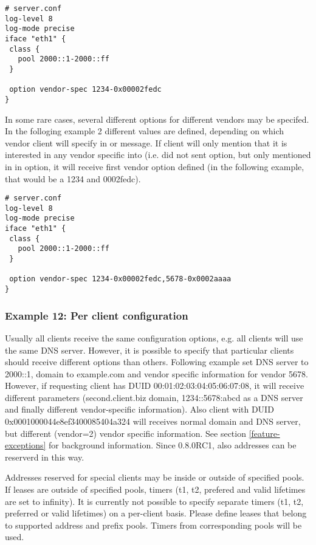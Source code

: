 \begin{lstlisting}
# server.conf
log-level 8
log-mode precise
iface "eth1" {
 class {
   pool 2000::1-2000::ff
 }

 option vendor-spec 1234-0x00002fedc
}
\end{lstlisting}

In some rare cases, several different options for different vendors
may be specifed. In the folloging example 2 different values are
defined, depending on which vendor client will specify in  or
 message. If client will only mention that it is interested in
any vendor specific into (i.e. did not sent  option, but
only mentioned in in  option, it will receive
first vendor option defined (in the following example, that would be a
1234 and 0002fedc).

\begin{lstlisting}
# server.conf
log-level 8
log-mode precise
iface "eth1" {
 class {
   pool 2000::1-2000::ff
 }

 option vendor-spec 1234-0x00002fedc,5678-0x0002aaaa
}
\end{lstlisting}

\subsubsection{Example 12: Per client configuration}
\label{example-server-exceptions}
Usually all clients receive the same configuration options, e.g. all
clients will use the same DNS server. However, it is possible to
specify that particular clients should receive different options than
others. Following example set DNS server to 2000::1, domain
to example.com and vendor specific information for vendor 5678.
However, if requesting client has DUID 00:01:02:03:04:05:06:07:08, it
will receive different parameters (second.client.biz domain,
1234::5678:abcd as a DNS server and finally different vendor-specific
information). Also client with DUID 0x0001000044e8ef3400085404a324
will receives normal domain and DNS server, but different (vendor=2)
vendor specific information. See section \ref{feature-exceptions} for
background information. Since 0.8.0RC1, also addresses can be reserverd
in this way.

Addresses reserved for special clients may be inside or outside of
specified pools. If leases are outside of specified pools, timers (t1,
t2, prefered and valid lifetimes are set to infinity). It is currently
not possible to specify separate timers (t1, t2, preferred or valid
lifetimes) on a per-client basis. Please define leases that belong to
supported address and prefix pools. Timers from corresponding pools
will be used.

